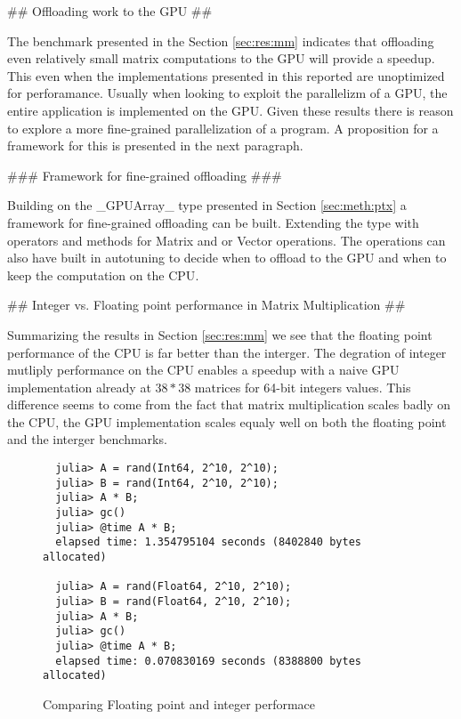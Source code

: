\begin{markdown}
## Offloading work to the GPU ##

The benchmark presented in the Section \ref{sec:res:mm} indicates that
offloading even relatively small matrix computations to the GPU will
provide a speedup. This even when the implementations presented in
this reported are unoptimized for perforamance. Usually when looking
to exploit the parallelizm of a GPU, the entire application is
implemented on the GPU. Given these results there is reason to explore
a more fine-grained parallelization of a program. A proposition for a
framework for this is presented in the next paragraph.

### Framework for fine-grained offloading ###

Building on the _GPUArray_ type presented in Section
\ref{sec:meth:ptx} a framework for fine-grained offloading can be
built. Extending the type with operators and methods for Matrix and or
Vector operations. The operations can also have built in autotuning to
decide when to offload to the \gls{GPU} and when to keep the computation
on the \gls{CPU}.

## Integer vs. Floating point performance in Matrix Multiplication ##

Summarizing the results in Section \ref{sec:res:mm} we see that the
floating point performance of the \gls{CPU} is far better than the
interger. The degration of integer mutliply performance on the
\gls{CPU} enables a speedup with a naive GPU implementation already at
$38*38$ matrices for 64-bit integers values. This difference seems to
come from the fact that matrix multiplication scales badly on the CPU,
the GPU implementation scales equaly well on both the floating point
and the interger benchmarks.


\begin{figure}[H]
  

  \begin{verbatim}
  julia> A = rand(Int64, 2^10, 2^10);
  julia> B = rand(Int64, 2^10, 2^10);
  julia> A * B;
  julia> gc()
  julia> @time A * B;
  elapsed time: 1.354795104 seconds (8402840 bytes allocated)
  
  julia> A = rand(Float64, 2^10, 2^10);
  julia> B = rand(Float64, 2^10, 2^10);
  julia> A * B;
  julia> gc()
  julia> @time A * B;
  elapsed time: 0.070830169 seconds (8388800 bytes allocated)
  \end{verbatim}
  \caption{Comparing Floating point and integer performace}
  \label{fig:julia:mm}
\end{figure}


\end{markdown}
